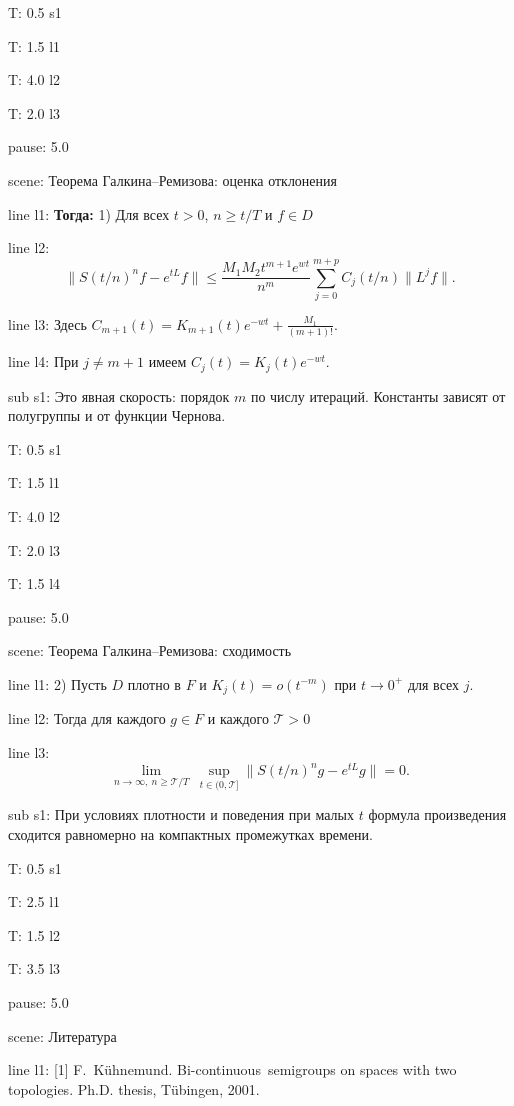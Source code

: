 \documentclass[a4paper,11pt]{article}
\begin{document}
T: 0.5 s1

T: 1.5 l1

T: 4.0 l2

T: 2.0 l3

pause: 5.0



scene: {Теорема Галкина--Ремизова: оценка отклонения}

line l1: {{\Large \textbf{Тогда:}} 1) Для всех $t>0$, $n\ge t/T$ и $f\in D$}

line l2: {$$\bigl\|S(t/n)^n f-e^{tL}f\bigr\|\le\frac{M_1M_2t^{m+1}e^{wt}}{n^m}\sum\limits_{j=0}^{m+p}C_j(t/n)\|L^jf\|.$$}

line l3: {Здесь $C_{m+1}(t)=K_{m+1}(t)e^{-wt}+\frac{M_1}{(m+1)!}$.}

line l4: {При $j\ne m+1$ имеем $C_j(t)=K_j(t)e^{-wt}$.}


sub s1: {Это явная скорость: порядок $m$ по числу итераций. Константы зависят от полугруппы и от функции Чернова.}


T: 0.5 s1

T: 1.5 l1

T: 4.0 l2

T: 2.0 l3

T: 1.5 l4

pause: 5.0



scene: {Теорема Галкина--Ремизова: сходимость}

line l1: {2) Пусть $D$ плотно в $F$ и $K_j(t)=o(t^{-m})$ при $t\to0^+$ для всех $j$.}

line l2: {Тогда для каждого $g\in F$ и каждого $\mathcal{T}>0$}

line l3: {$$\lim\limits_{n\to\infty,\ n\ge\mathcal{T}/T}\ \sup\limits_{t\in(0,\mathcal{T}]}\bigl\|S(t/n)^n g-e^{tL}g\bigr\|=0.$$}


sub s1: {При условиях плотности и поведения при малых $t$ формула произведения сходится равномерно на компактных промежутках времени.}


T: 0.5 s1

T: 2.5 l1

T: 1.5 l2

T: 3.5 l3

pause: 5.0



scene: {Литература}

line l1: {[1] F.~Kühnemund. Bi-continuous\ semigroups on spaces with two topologies. Ph.D. thesis, Tübingen, 2001.}
\end{document}

